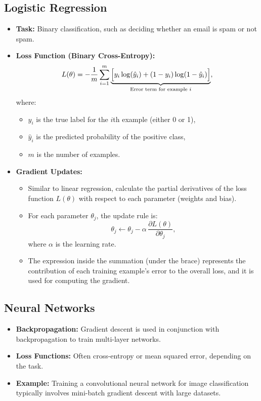 \documentclass{article}
\begin{document}
\subsection{Logistic Regression}
\begin{itemize}
    \item \textbf{Task:} Binary classification, such as deciding whether an email is spam or not spam.
    \item \textbf{Loss Function (Binary Cross-Entropy):}
    \[
    L(\theta) = -\frac{1}{m}\sum_{i=1}^{m}\underbrace{\Bigl[y_i\log (\hat{y}_i)+(1-y_i)\log (1-\hat{y}_i)\Bigr]}_{\text{Error term for example }i},
    \]
    where:
    \begin{itemize}[label=\(\bullet\)]
        \item \(y_i\) is the true label for the \(i\)th example (either 0 or 1),
        \item \(\hat{y}_i\) is the predicted probability of the positive class,
        \item \(m\) is the number of examples.
    \end{itemize}

    \item \textbf{Gradient Updates:}
    \begin{itemize}[label=\(\bullet\)]
        \item Similar to linear regression, calculate the partial derivatives of the loss function \(L(\theta)\) with respect to each parameter (weights and bias).
        \item For each parameter \(\theta_j\), the update rule is:
        \[
        \theta_j \leftarrow \theta_j - \alpha \, \frac{\partial L(\theta)}{\partial \theta_j},
        \]
        where \(\alpha\) is the learning rate.
        \item The expression inside the summation (under the brace) represents the contribution of each training example's error to the overall loss, and it is used for computing the gradient.
    \end{itemize}
\end{itemize}


\subsection{Neural Networks}
\begin{itemize}
    \item \textbf{Backpropagation:} Gradient descent is used in conjunction with backpropagation to train multi-layer networks.
    \item \textbf{Loss Functions:} Often cross-entropy or mean squared error, depending on the task.
    \item \textbf{Example:} Training a convolutional neural network for image classification typically involves mini-batch gradient descent with large datasets.
\end{itemize}
\end{document}
